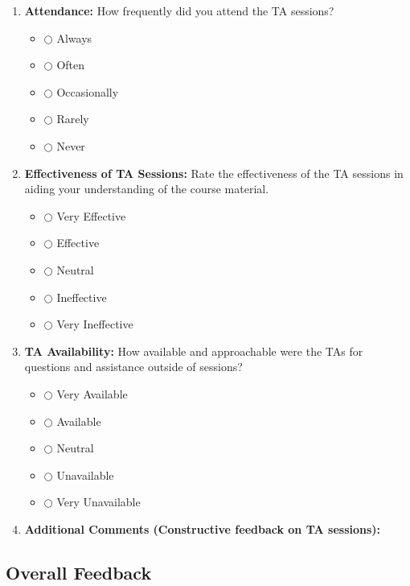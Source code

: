 \documentclass[a4paper,12pt]{article}
\begin{document}
\begin{enumerate}[label=\textbf{\arabic*.}]
    \item \textbf{Attendance:} How frequently did you attend the TA sessions?
    \begin{itemize}
        \item[] $\bigcirc$ Always
        \item[] $\bigcirc$ Often
        \item[] $\bigcirc$ Occasionally
        \item[] $\bigcirc$ Rarely
        \item[] $\bigcirc$ Never
    \end{itemize}

    \item \textbf{Effectiveness of TA Sessions:} Rate the effectiveness of the TA sessions in aiding your understanding of the course material.
    \begin{itemize}
        \item[] $\bigcirc$ Very Effective
        \item[] $\bigcirc$ Effective
        \item[] $\bigcirc$ Neutral
        \item[] $\bigcirc$ Ineffective
        \item[] $\bigcirc$ Very Ineffective
    \end{itemize}

    \item \textbf{TA Availability:} How available and approachable were the TAs for questions and assistance outside of sessions?
    \begin{itemize}
        \item[] $\bigcirc$ Very Available
        \item[] $\bigcirc$ Available
        \item[] $\bigcirc$ Neutral
        \item[] $\bigcirc$ Unavailable
        \item[] $\bigcirc$ Very Unavailable
    \end{itemize}

    \item \textbf{Additional Comments (Constructive feedback on TA sessions):} \\
    \hrulefill
    \vspace{3cm}

\end{enumerate}

\subsection*{Overall Feedback}
\end{document}
